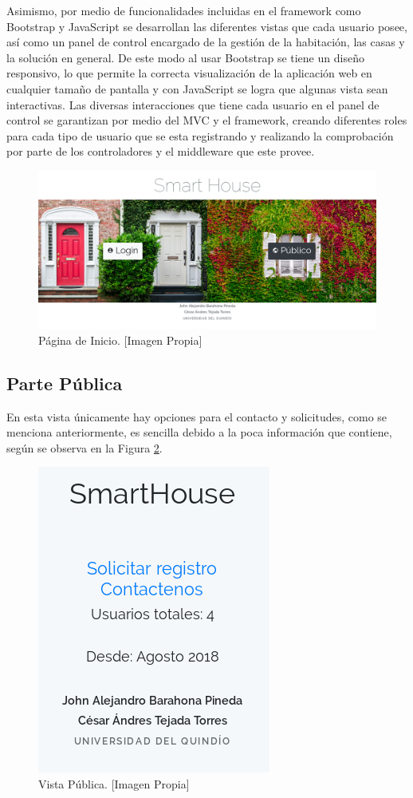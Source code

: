 Asimismo, por medio de funcionalidades incluidas en el framework como Bootstrap y JavaScript se desarrollan las diferentes vistas que cada usuario posee, así como un panel de control encargado de la gestión de la habitación, las casas y la solución en general. De este modo al usar Bootstrap se tiene un diseño responsivo, lo que permite la correcta visualización de la aplicación web en cualquier tamaño de pantalla y con JavaScript se logra que algunas vista sean interactivas. Las diversas interacciones que tiene cada usuario en el panel de control se garantizan por medio del MVC y el framework, creando diferentes roles para cada tipo de usuario que se esta registrando y realizando la comprobación por parte de los controladores y el middleware que este provee.\\

\begin{figure}[H]
	\centering
	\caption[Página de Inicio.]{Página de Inicio. [Imagen Propia]}
	\label{fig:index}
	\includegraphics[width=0.5\linewidth]{Imagenes/Index}
\end{figure}

\subsection{Parte Pública}

En esta vista únicamente hay opciones para el contacto y solicitudes, como se menciona anteriormente, es sencilla debido a la poca información que contiene, según se observa en la Figura \ref{fig:publicview}.

\begin{figure}[H]
	\centering
	\caption[Vista Pública.]{Vista Pública. [Imagen Propia]}
	\label{fig:publicview}
	\includegraphics[width=0.25\linewidth]{Imagenes/Public_view}
\end{figure}

